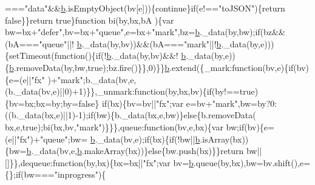 \begin{DoxyCode}
      ===\textcolor{stringliteral}{"data"}&&\hyperlink{jquery_8js_aa4026ad5544b958e54ce5e106fa1c805}{b}.isEmptyObject(bv[e]))\{\textcolor{keywordflow}{continue}\}\textcolor{keywordflow}{if}(e!==\textcolor{stringliteral}{"toJSON"})\{\textcolor{keywordflow}{return} \textcolor{keyword}{false}\}\}\textcolor{keywordflow}{return} \textcolor{keyword}{true}\}\textcolor{keyword}{function} bi(by,bx,bA
      )\{var bw=bx+\textcolor{stringliteral}{"defer"},bv=bx+\textcolor{stringliteral}{"queue"},e=bx+\textcolor{stringliteral}{"mark"},bz=\hyperlink{jquery_8js_aa4026ad5544b958e54ce5e106fa1c805}{b}.\_data(by,bw);\textcolor{keywordflow}{if}(bz&&(bA===\textcolor{stringliteral}{"queue"}||!
      \hyperlink{jquery_8js_aa4026ad5544b958e54ce5e106fa1c805}{b}.\_data(by,bv))&&(bA===\textcolor{stringliteral}{"mark"}||!\hyperlink{jquery_8js_aa4026ad5544b958e54ce5e106fa1c805}{b}.\_data(by,e)))\{setTimeout(\textcolor{keyword}{function}()\{\textcolor{keywordflow}{if}(!\hyperlink{jquery_8js_aa4026ad5544b958e54ce5e106fa1c805}{b}.\_data(by,bv)&&!
      \hyperlink{jquery_8js_aa4026ad5544b958e54ce5e106fa1c805}{b}.\_data(by,e))\{\hyperlink{jquery_8js_aa4026ad5544b958e54ce5e106fa1c805}{b}.removeData(by,bw,\textcolor{keyword}{true});bz.fire()\}\},0)\}\}\hyperlink{jquery_8js_aa4026ad5544b958e54ce5e106fa1c805}{b}.extend(\{\_mark:function(bv,e)\{if(bv)\{e=(e||\textcolor{stringliteral}{"fx"}
      )+\textcolor{stringliteral}{"mark"};b.\_data(bv,e,(b.\_data(bv,e)||0)+1)\}\},\_unmark:\textcolor{keyword}{function}(by,bx,bv)\{if(by!==true)\{bv=bx;bx=by;by=false\}\textcolor{keywordflow}{
      if}(bx)\{bv=bv||\textcolor{stringliteral}{"fx"};var e=bv+\textcolor{stringliteral}{"mark"},bw=by?0:((b.\_data(bx,e)||1)-1);if(bw)\{b.\_data(bx,e,bw)\}\textcolor{keywordflow}{else}\{b.removeData(
      bx,e,true);bi(bx,bv,\textcolor{stringliteral}{"mark"})\}\}\},queue:\textcolor{keyword}{function}(bv,e,bx)\{var bw;\textcolor{keywordflow}{if}(bv)\{e=(e||\textcolor{stringliteral}{"fx"})+\textcolor{stringliteral}{"queue"};bw=
      \hyperlink{jquery_8js_aa4026ad5544b958e54ce5e106fa1c805}{b}.\_data(bv,e);\textcolor{keywordflow}{if}(bx)\{\textcolor{keywordflow}{if}(!bw||\hyperlink{jquery_8js_aa4026ad5544b958e54ce5e106fa1c805}{b}.isArray(bx))\{bw=\hyperlink{jquery_8js_aa4026ad5544b958e54ce5e106fa1c805}{b}.\_data(bv,e,\hyperlink{jquery_8js_aa4026ad5544b958e54ce5e106fa1c805}{b}.makeArray(bx))\}\textcolor{keywordflow}{else}\{bw.push(bx)\}\}\textcolor{keywordflow}{return} 
      bw||[]\}\},dequeue:\textcolor{keyword}{function}(by,bx)\{bx=bx||\textcolor{stringliteral}{"fx"};var bv=\hyperlink{jquery_8js_aa4026ad5544b958e54ce5e106fa1c805}{b}.queue(by,bx),bw=bv.shift(),e=\{\};\textcolor{keywordflow}{if}(bw===\textcolor{stringliteral}{"inprogress"})\{

\end{DoxyCode}
